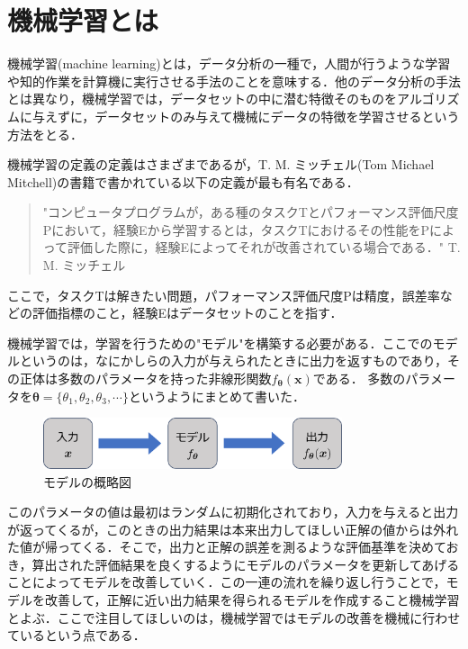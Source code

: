 \documentclass[a4paper,11pt]{jsreport}
\begin{document}
\section{機械学習とは}
機械学習(machine learning)とは，データ分析の一種で，人間が行うような学習や知的作業を計算機に実行させる手法のことを意味する．他のデータ分析の手法とは異なり，機械学習では，データセットの中に潜む特徴そのものをアルゴリズムに与えずに，データセットのみ与えて機械にデータの特徴を学習させるという方法をとる．\par
機械学習の定義の定義はさまざまであるが，T. M. ミッチェル(Tom Michael Mitchell)の書籍\cite{Tom1997Machine}で書かれている以下の定義が最も有名である．
\begin{quote}
  "コンピュータプログラムが，ある種のタスクTとパフォーマンス評価尺度Pにおいて，経験Eから学習するとは，タスクTにおけるその性能をPによって評価した際に，経験Eによってそれが改善されている場合である．"
  \hfill T. M. ミッチェル
\end{quote}
ここで，タスクTは解きたい問題，パフォーマンス評価尺度Pは精度，誤差率などの評価指標のこと，経験Eはデータセットのことを指す．\par
機械学習では，学習を行うための"モデル"を構築する必要がある．ここでのモデルというのは，なにかしらの入力が与えられたときに出力を返すものであり，その正体は多数のパラメータを持った非線形関数$f_{\bm{\theta}}(\bm{x})$である． 多数のパラメータを$\bm{\theta} = \{ \theta_1, \theta_2, \theta_3, \cdots \}$というようにまとめて書いた．
\begin{figure}[b]
  \begin{center}
    \includegraphics[height=1.5cm]{image/モデル概略図.png}
    \caption{モデルの概略図}
  \end{center}
\end{figure}
このパラメータの値は最初はランダムに初期化されており，入力を与えると出力が返ってくるが，このときの出力結果は本来出力してほしい正解の値からは外れた値が帰ってくる．そこで，出力と正解の誤差を測るような評価基準を決めておき，算出された評価結果を良くするようにモデルのパラメータを更新してあげることによってモデルを改善していく．この一連の流れを繰り返し行うことで，モデルを改善して，正解に近い出力結果を得られるモデルを作成すること機械学習とよぶ．ここで注目してほしいのは，機械学習ではモデルの改善を機械に行わせているという点である．\par
\end{document}
